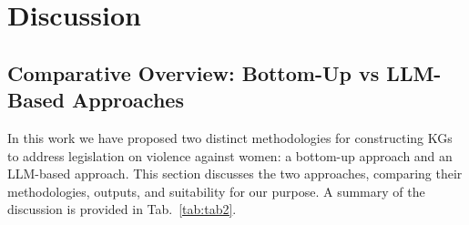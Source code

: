 \documentclass[runningheads]{llncs}
\begin{document}
\section{Discussion} \label{disc}

\subsection{Comparative Overview: Bottom-Up vs LLM-Based Approaches}
In this work we have proposed two distinct methodologies for constructing KGs to address legislation on violence against women: a bottom-up approach and an LLM-based approach. %
This section discusses the two approaches, comparing their methodologies, outputs, and suitability for our purpose. A summary of the discussion is provided in 
Tab.~\ref{tab:tab2}.  
\end{document}
